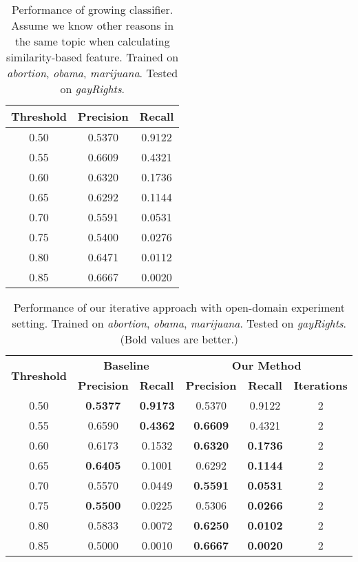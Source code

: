 \documentclass[11pt,a4paper]{article}
\begin{document}
\begin{table}[h]
\begin{center}
\begin{tabular}{|c||c|c|}
\hline \bf Threshold & \bf Precision & \bf Recall \\ \hline\hline
0.50 & 0.5370 & 0.9122 \\
0.55 & 0.6609 & 0.4321 \\
0.60 & 0.6320 & 0.1736 \\
0.65 & 0.6292 & 0.1144 \\
0.70 & 0.5591 & 0.0531 \\
0.75 & 0.5400 & 0.0276 \\
0.80 & 0.6471 & 0.0112 \\
0.85 & 0.6667 & 0.0020 \\
\hline
\end{tabular}
\end{center}
\caption{\label{tab:gc} Performance of growing classifier. Assume we know other reasons in the same topic when calculating similarity-based feature. Trained on {\it abortion}, {\it obama}, {\it marijuana}. Tested on {\it gayRights}.}
\end{table}


\begin{table*}[h]
\begin{center}
\begin{tabular}{|c||c|c|c|c|c|}
\hline
\multicolumn{1}{|c|}{\multirow{2}{*}{\bf Threshold}} & \multicolumn{2}{c|}{\bf Baseline}  & \multicolumn{3}{c|}{\bf Our Method}    \\ \cline{2-6} 
\multicolumn{1}{|c|}{}   & \multicolumn{1}{l|}{\bf Precision} & \multicolumn{1}{l|}{\bf Recall} & \multicolumn{1}{l|}{\bf Precision} & \multicolumn{1}{c|}{\bf Recall} & \multicolumn{1}{l|}{\bf Iterations} \\ \hline
 \hline
0.50     & \bf 0.5377& \bf0.9173   & 0.5370 & 0.9122    & 2 \\
0.55     & 0.6590& \bf0.4362   &\bf 0.6609 & 0.4321    & 2 \\
0.60     & 0.6173& 0.1532   &\bf 0.6320 &\bf 0.1736    & 2 \\
0.65     &\bf 0.6405& 0.1001   & 0.6292 & \bf0.1144    & 2 \\
0.70     & 0.5570& 0.0449   &\bf 0.5591 &\bf 0.0531    & 2 \\
0.75     &\bf 0.5500& 0.0225   & 0.5306 &\bf 0.0266    & 2 \\
0.80     & 0.5833& 0.0072   &\bf 0.6250 &\bf 0.0102    & 2 \\
0.85     & 0.5000& 0.0010   &\bf 0.6667 &\bf 0.0020    & 2
\\\hline
\end{tabular}
\end{center}
\caption{\label{tab:cross-gay} Performance of our iterative approach with open-domain experiment setting. Trained on {\it abortion}, {\it obama}, {\it marijuana}. Tested on {\it gayRights}. (Bold values are better.)}
\end{table*}
\end{document}
